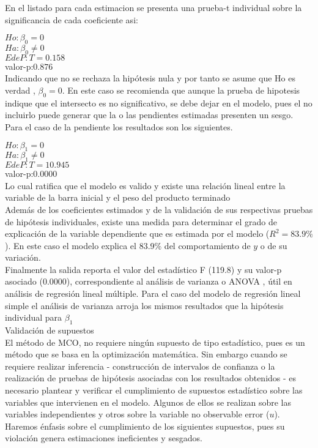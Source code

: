 \documentclass[base=hide,12pt]{elegantbook}
\begin{document}
	
En el listado para cada estimacion se presenta una prueba-t individual sobre la significancia de cada coeficiente asi:
	
	$Ho: \beta_{0} =0$ \\
	$Ha: \beta_{0} \neq 0$\\
	$EdeP : T = 0.158$\\
	valor-p:$  0.876$\\
	
	Indicando que no se rechaza la hipótesis nula y por tanto se asume que Ho es verdad , $\beta_{0}=0$. En este caso se recomienda que aunque la prueba de hipotesis indique que el intersecto es no significativo, se debe dejar en el modelo, pues el no incluirlo puede generar que la o las pendientes estimadas presenten un sesgo.
	\\
	
	Para el caso de la pendiente los resultados son los siguientes.
	
	$Ho: \beta_{1} =0$ \\
	$Ha: \beta_{1} \neq 0$\\
	$EdeP : T = 10.945$\\
	valor-p:$  0.0000$\\
	
	Lo cual ratifica que el modelo es valido y existe una relación lineal entre la variable de la barra inicial y el peso del producto terminado\\
	
	Además de los coeficientes estimados y de la validación de sus respectivas pruebas de hipótesis individuales, existe una medida para determinar el grado de explicación de la variable dependiente que es estimada por el modelo ($R^{2}=83.9\%$). En este caso el modelo explica el 83.9\% del comportamiento de $y$ o de su variación.\\
	
	
	Finalmente la salida reporta el valor del estadístico  F (119.8) y su valor-p asociado (0.0000), correspondiente al análisis de varianza o ANOVA , útil en análisis de regresión lineal múltiple. Para el caso del modelo de regresión lineal simple el análisis de varianza arroja los mismos resultados que la hipótesis individual para $\beta_{1}$\\
	
	
	\textcolor{col4}{\Large Validación de supuestos}\\
	
	El método de MCO, no requiere ningún supuesto de tipo estadístico, pues es un método que se basa en la optimización matemática. Sin embargo cuando se requiere realizar inferencia - construcción de intervalos de confianza o la realización de pruebas de hipótesis asociadas con los resultados obtenidos -  es necesario plantear y verificar el cumplimiento de supuestos estadístico sobre las variables que intervienen en el modelo. Algunos de ellos se realizan sobre las variables independientes y otros sobre la variable no observable error ($u$). Haremos énfasis sobre el cumplimiento de los siguientes supuestos, pues su violación genera estimaciones ineficientes y sesgados.
	
\end{document}

